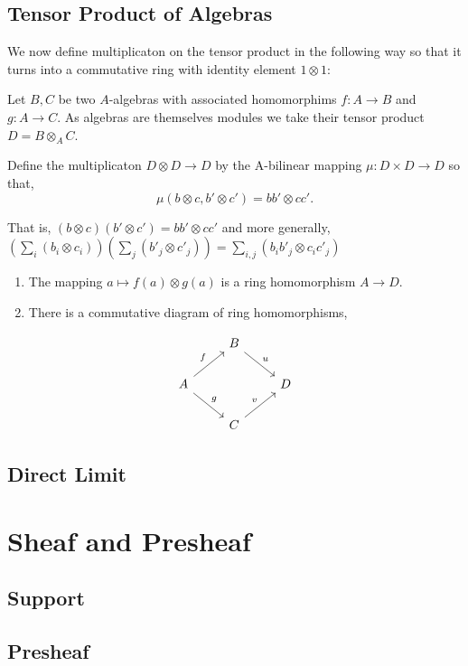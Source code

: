\documentclass[]{report}
\begin{document}
\section{Tensor Product of Algebras}

We now define multiplicaton on the tensor product in the following way so that it turns into a commutative ring with identity element $1\otimes 1$:

Let $B,C$ be two $A$-algebras with associated homomorphims $f:A\rightarrow B$ and $g:A\rightarrow C$. As algebras are themselves modules we take their tensor product $D = B\otimes_A C$. 

Define the multiplicaton $D\otimes D \rightarrow D$ by the A-bilinear mapping $\mu: D\times D \rightarrow D$ so that,
$$\mu(b\otimes c, b'\otimes c') = bb' \otimes cc'. $$


That is, $(b\otimes c)(b'\otimes c') = bb'\otimes cc'$ and more generally, $(\sum_i(b_i\otimes c_i))(\sum_j(b'_j\otimes c'_j)) = \sum_{i,j}(b_i b'_j \otimes c_i c'_j)$
\begin{enumerate}
    \item The mapping $a\mapsto f(a)\otimes g(a)$ is a ring homomorphism $A\rightarrow D$. 
    \item There is a commutative diagram of ring homomorphisms, 
\end{enumerate}

\begin{equation*}
    \begin{tikzcd}
                                  & B \arrow[rd, "u"] &   \\
        A \arrow[ru, "f"] \arrow[rd, "g"] &                   & D \\
                                  & C \arrow[ru, "v"] &  
    \end{tikzcd}
\end{equation*}


\section{Direct Limit}

\chapter{Sheaf and Presheaf}
\section{Support}
\section{Presheaf}
\end{document}
